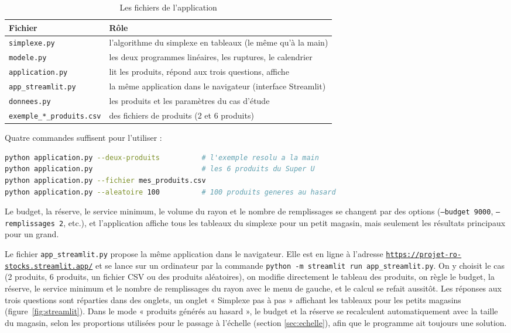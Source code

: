 \documentclass[11pt,a4paper]{article}
\begin{document}
\begin{table}[!htbp]
\centering\small
\caption{Les fichiers de l'application}\label{tab:fichiers}
\begin{tabular}{@{}p{5.2cm}p{9cm}@{}}
\toprule
Fichier & Rôle \\
\midrule
\texttt{simplexe.py} & l'algorithme du simplexe en tableaux (le même qu'à la main) \\
\texttt{modele.py} & les deux programmes linéaires, les ruptures, le calendrier \\
\texttt{application.py} & lit les produits, répond aux trois questions, affiche \\
\texttt{app\_streamlit.py} & la même application dans le navigateur (interface Streamlit) \\
\texttt{donnees.py} & les produits et les paramètres du cas d'étude \\
\texttt{exemple\_*\_produits.csv} & des fichiers de produits (2 et 6 produits) \\
\bottomrule
\end{tabular}
\end{table}

Quatre commandes suffisent pour l'utiliser :
\begin{lstlisting}[language=bash]
python application.py --deux-produits          # l'exemple resolu a la main
python application.py                          # les 6 produits du Super U
python application.py --fichier mes_produits.csv
python application.py --aleatoire 100          # 100 produits generes au hasard
\end{lstlisting}
Le budget, la réserve, le service minimum, le volume du rayon et le nombre de remplissages se
changent par des options (\texttt{--budget 9000}, \texttt{--remplissages 2}, etc.), et
l'application affiche tous les tableaux du simplexe pour un petit magasin, mais seulement les
résultats principaux pour un grand.

Le fichier \texttt{app\_streamlit.py} propose la même application dans le navigateur. Elle est
en ligne à l'adresse \href{https://projet-ro-stocks.streamlit.app/}{\texttt{https://projet-ro-stocks.streamlit.app/}}
et se lance sur un ordinateur par la commande \texttt{python -m streamlit run app\_streamlit.py}.
On y choisit le cas (2 produits, 6 produits, un fichier CSV ou des produits aléatoires), on
modifie directement le tableau des produits, on règle le budget, la réserve, le service
minimum et le nombre de remplissages du rayon avec le menu de gauche, et le calcul se refait
aussitôt. Les réponses aux trois questions sont réparties dans des onglets, un onglet « Simplexe
pas à pas » affichant les tableaux pour les petits magasins (figure~\ref{fig:streamlit}). Dans le
mode « produits générés au hasard », le budget et la réserve se recalculent automatiquement avec
la taille du magasin, selon les proportions utilisées pour le passage à l'échelle (section
\ref{sec:echelle}), afin que le programme ait toujours une solution.
\end{document}
